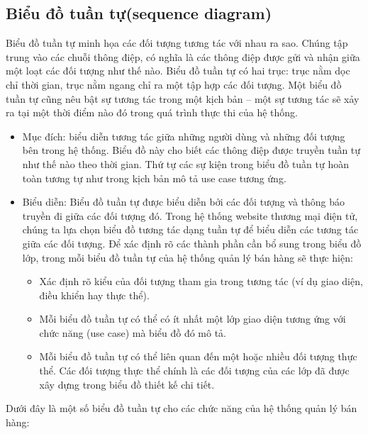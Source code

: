 \subsection{Biểu đồ tuần tự(sequence diagram)}
Biểu đồ tuần tự minh họa các đối tượng tương tác với nhau ra sao. Chúng tập trung vào các chuỗi thông điệp, có nghĩa là các thông điệp được gửi và nhận giữa một loạt các đối tượng như thế nào. Biểu đồ tuần tự có hai trục: trục nằm dọc chỉ thời gian, trục nằm ngang chỉ ra một tập hợp các đối tượng. Một biểu đồ tuần tự cũng nêu bật sự tương tác trong một kịch bản – một sự tương tác sẽ xảy ra tại một thời điểm nào đó trong quá trình thực thi của hệ thống.
\begin{itemize}
\item Mục đích: biểu diễn tương tác giữa những người dùng và những đối tượng bên trong hệ thống. Biểu đồ này cho biết các thông điệp được truyền tuần tự như thế nào theo thời gian. Thứ tự các sự kiện trong biểu đồ tuần tự hoàn toàn tương tự như trong kịch bản mô tả use case tương ứng.
\item Biểu diễn: Biểu đồ tuần tự được biểu diễn bởi các đối tượng và thông báo truyền đi giữa các đối tượng đó. Trong hệ thống website thương mại điện tử, chúng ta lựa chọn biểu đồ tương tác dạng tuần tự để biểu diễn các tương tác giữa các đối tượng. Để xác định rõ các thành phần cần bổ sung trong biểu đồ lớp, trong mỗi biểu đồ tuần tự của hệ thống quản lý bán hàng sẽ thực hiện:
\begin{itemize}
\item Xác định rõ kiểu của đối tượng tham gia trong tương tác (ví dụ giao diện, điều khiển hay thực thể).
\item Mỗi biểu đồ tuần tự có thể có ít nhất một lớp giao diện tương ứng với chức năng (use case) mà biểu đồ đó mô tả.
\item Mỗi biểu đồ tuần tự có thể liên quan đến một hoặc nhiều đối tượng thực thể. Các đối tượng thực thể chính là các  đối tượng của các lớp  đã được xây dựng trong biểu đồ thiết kế chi tiết.
\end{itemize}
\end{itemize}
\par
Dưới đây là một số biểu đồ tuần tự cho các chức năng của hệ thống quản lý bán hàng:



